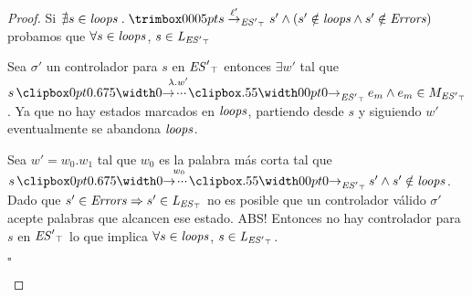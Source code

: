 \begin{proof}
Si $\nexists s \in \SCC \ldot \trimlst{s \step{\l'}{\unexploredToTop{\structure'}}  s'} \wedge (s' \notin \SCC \wedge s' \notin \Errors)$ probamos que $\forall s \in \mathit{loops}$, $s \in \mathit{L_{\mathit{{\mathit{ES}'}_{\top}}}}$

Sea $\sigma'$ un controlador para $s$ en $\mathit{{\mathit{ES}'}_{\top}}$ entonces $\exists w'$ tal que  $s \runw{\lambda.w'}{\unexploredToTop{\structure'}} e_m \wedge e_m \in M_{\unexploredToTop{\structure'}}$. Ya que no hay estados marcados en $\mathit{loops}$, partiendo desde $s$ y siguiendo $w'$ eventualmente se abandona $\mathit{loops}$.

Sea $w' = w_0.w_1$ tal que $w_0$ es la palabra más corta tal que $s \runw{w_0}{\unexploredToTop{\structure'}} s' \wedge s' \notin \SCC$. Dado que $s'\in \mathit{Errors} \Rightarrow s' \in \mathit{L_{\mathit{{\mathit{ES}}_{\top}}}}$ no es posible que un controlador válido $\sigma'$ acepte palabras que alcancen ese estado. ABS! Entonces no hay controlador para $s$ en $\mathit{{\mathit{ES}'}_{\top}}$ lo que implica $\forall s \in \mathit{loops}$, $s \in \mathit{L_{\mathit{{\mathit{ES}'}_{\top}}}}$.
\begin{flushright}
	$\square$
\end{flushright}
\end{proof}